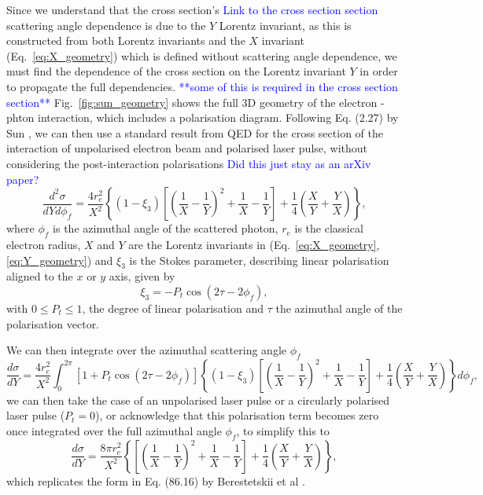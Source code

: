 \documentclass[../main.tex]{subfiles}
\begin{document}
Since we understand that the cross section's \textcolor{blue}{Link to the cross section section} scattering angle dependence is due to the $Y$ Lorentz invariant, as this is constructed from both Lorentz invariants and the $X$ invariant (Eq.~\ref{eq:X_geometry}) which is defined without scattering angle dependence, we must find the dependence of the cross section on the Lorentz invariant $Y$ in order to propagate the full dependencies. \textcolor{blue}{**some of this is required in the cross section section**} Fig.~\ref{fig:sun_geometry} shows the full 3D geometry of the electron - phton interaction, which includes a polarisation diagram. Following Eq. (2.27) by Sun \cite{sun2009characterizations}, we can then use a standard result from QED for the cross section of the interaction of unpolarised electron beam and polarised laser pulse, without considering the post-interaction polarisations \cite{grozin2002complete} \textcolor{blue}{Did this just stay as an arXiv paper?}
\begin{equation}
\frac{d^{2}\sigma}{dYd\phi_{f}} = \frac{4r_{e}^{2}}{X^{2}}\left\{\left(1-\xi_{3}\right)\left[\left(\frac{1}{X}-\frac{1}{Y}\right)^{2}+\frac{1}{X}-\frac{1}{Y}\right]+\frac{1}{4}\left(\frac{X}{Y}+\frac{Y}{X}\right)\right\},
\label{eq:differential_cross_section_Y_phif}
\end{equation}
where $\phi_{f}$ is the azimuthal angle of the scattered photon, $r_{e}$ is the classical electron radius, $X$ and $Y$ are the Lorentz invariants in (Eq.~\ref{eq:X_geometry}, \ref{eq:Y_geometry}) and $\xi_{3}$ is the Stokes parameter, describing linear polarisation aligned to the $x$ or $y$ axis, given by
\begin{equation}
\xi_{3} = -P_{t}\cos\left(2\tau-2\phi_{f}\right),
\label{eq:stokes_3}
\end{equation} 
with $0 \leq P_{t} \leq 1$, the degree of linear polarisation and $\tau$ the azimuthal angle of the polarisation vector. 

We can then integrate over the azimuthal scattering angle $\phi_{f}$
\begin{equation}
\frac{d\sigma}{dY} = \frac{4r_{e}^{2}}{X^{2}}\int_{0}^{2\pi}\left[1+P_{t}\cos\left(2\tau-2\phi_{f}\right)\right]\left\{\left(1-\xi_{3}\right)\left[\left(\frac{1}{X}-\frac{1}{Y}\right)^{2}+\frac{1}{X}-\frac{1}{Y}\right]+\frac{1}{4}\left(\frac{X}{Y}+\frac{Y}{X}\right)\right\} d\phi_{f}, 
\label{eq:phif_integral}
\end{equation}
we can then take the case of an unpolarised laser pulse or a circularly polarised laser pulse ($P_{t} = 0$), or acknowledge that this polarisation term becomes zero once integrated over the full azimuthal angle $\phi_{f}$, to simplify this to
\begin{equation}
\frac{d\sigma}{dY} = \frac{8\pi r_{e}^{2}}{X^{2}}\left\{\left[\left(\frac{1}{X}-\frac{1}{Y}\right)^{2}+\frac{1}{X}-\frac{1}{Y}\right]+\frac{1}{4}\left(\frac{X}{Y}+\frac{Y}{X}\right)\right\},
\label{eq:cross_section_Y_berestetskii_form}
\end{equation}
which replicates the form in Eq. (86.16) by Berestetskii et al \cite{berestetskii1982quantum}.
\end{document}

